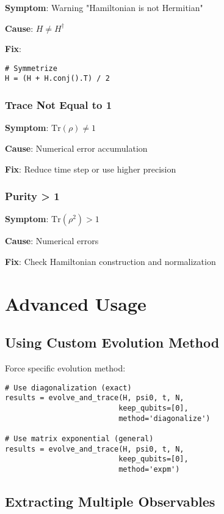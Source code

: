 \documentclass[11pt,a4paper]{article}
\begin{document}
\textbf{Symptom}: Warning "Hamiltonian is not Hermitian"

\textbf{Cause}: $H \neq H^\dagger$

\textbf{Fix}:
\begin{lstlisting}
# Symmetrize
H = (H + H.conj().T) / 2
\end{lstlisting}

\subsubsection{Trace Not Equal to 1}

\textbf{Symptom}: $\text{Tr}(\rho) \neq 1$

\textbf{Cause}: Numerical error accumulation

\textbf{Fix}: Reduce time step or use higher precision

\subsubsection{Purity > 1}

\textbf{Symptom}: $\text{Tr}(\rho^2) > 1$

\textbf{Cause}: Numerical errors

\textbf{Fix}: Check Hamiltonian construction and normalization

\section{Advanced Usage}

\subsection{Using Custom Evolution Method}

Force specific evolution method:

\begin{lstlisting}
# Use diagonalization (exact)
results = evolve_and_trace(H, psi0, t, N,
                          keep_qubits=[0],
                          method='diagonalize')

# Use matrix exponential (general)
results = evolve_and_trace(H, psi0, t, N,
                          keep_qubits=[0],
                          method='expm')
\end{lstlisting}

\subsection{Extracting Multiple Observables}
\end{document}
